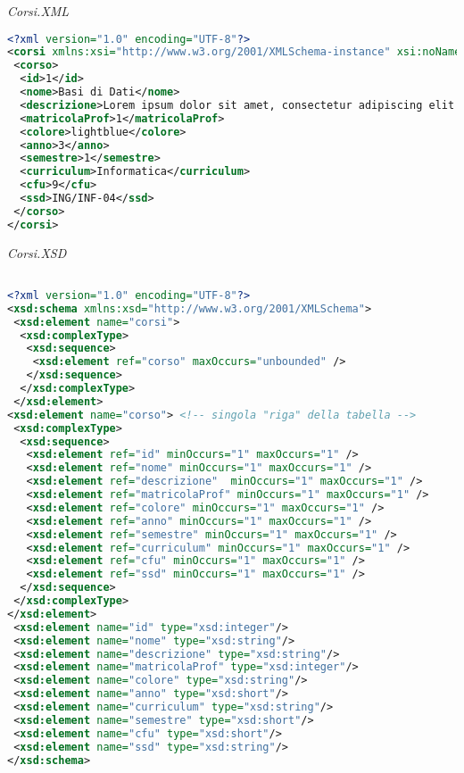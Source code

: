 \documentclass [a4paper,11pt]{book}
\begin{document}
\medskip

\emph{Corsi.XML}

\begin{lstlisting}[language=XML]
<?xml version="1.0" encoding="UTF-8"?>
<corsi xmlns:xsi="http://www.w3.org/2001/XMLSchema-instance" xsi:noNamespaceSchemaLocation="corsi.xsd">
 <corso>
  <id>1</id>
  <nome>Basi di Dati</nome>
  <descrizione>Lorem ipsum dolor sit amet, consectetur adipiscing elit. Curabitur ultricies.</descrizione>
  <matricolaProf>1</matricolaProf>
  <colore>lightblue</colore>
  <anno>3</anno>
  <semestre>1</semestre>
  <curriculum>Informatica</curriculum>
  <cfu>9</cfu>
  <ssd>ING/INF-04</ssd>
 </corso>
</corsi>
\end{lstlisting}

\medskip

\emph{Corsi.XSD}

\begin{lstlisting}[language=XML]

<?xml version="1.0" encoding="UTF-8"?>
<xsd:schema xmlns:xsd="http://www.w3.org/2001/XMLSchema">
 <xsd:element name="corsi">
  <xsd:complexType>
   <xsd:sequence>
    <xsd:element ref="corso" maxOccurs="unbounded" />
   </xsd:sequence>
  </xsd:complexType>
 </xsd:element>
<xsd:element name="corso"> <!-- singola "riga" della tabella -->
 <xsd:complexType>
  <xsd:sequence>
   <xsd:element ref="id" minOccurs="1" maxOccurs="1" /> 
   <xsd:element ref="nome" minOccurs="1" maxOccurs="1" />
   <xsd:element ref="descrizione"  minOccurs="1" maxOccurs="1" />
   <xsd:element ref="matricolaProf" minOccurs="1" maxOccurs="1" />
   <xsd:element ref="colore" minOccurs="1" maxOccurs="1" />
   <xsd:element ref="anno" minOccurs="1" maxOccurs="1" />
   <xsd:element ref="semestre" minOccurs="1" maxOccurs="1" />
   <xsd:element ref="curriculum" minOccurs="1" maxOccurs="1" />
   <xsd:element ref="cfu" minOccurs="1" maxOccurs="1" />
   <xsd:element ref="ssd" minOccurs="1" maxOccurs="1" />
  </xsd:sequence>   
 </xsd:complexType>
</xsd:element>
 <xsd:element name="id" type="xsd:integer"/>
 <xsd:element name="nome" type="xsd:string"/>
 <xsd:element name="descrizione" type="xsd:string"/>
 <xsd:element name="matricolaProf" type="xsd:integer"/>
 <xsd:element name="colore" type="xsd:string"/>
 <xsd:element name="anno" type="xsd:short"/>
 <xsd:element name="curriculum" type="xsd:string"/>
 <xsd:element name="semestre" type="xsd:short"/>
 <xsd:element name="cfu" type="xsd:short"/>
 <xsd:element name="ssd" type="xsd:string"/>
</xsd:schema>
\end{lstlisting}
\end{document}
